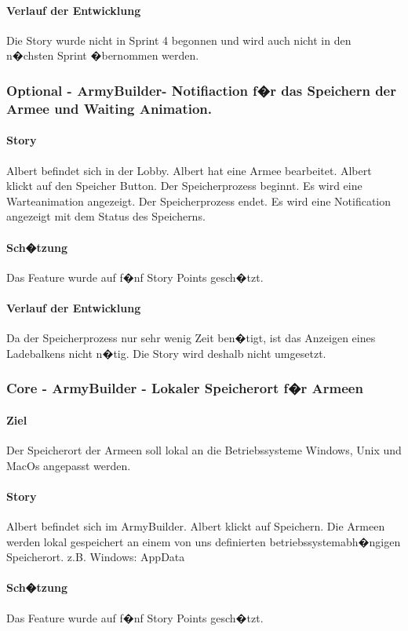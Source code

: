 \documentclass[12pt, titlepage]{scrartcl}
\begin{document}
			\paragraph{Verlauf der Entwicklung} 
			Die Story wurde nicht in Sprint 4 begonnen und wird auch nicht in den n�chsten Sprint �bernommen werden.
			\subsubsection{Optional - ArmyBuilder- Notifiaction f�r das Speichern der Armee und Waiting Animation.}
			\paragraph{Story} Albert befindet sich in der Lobby. Albert hat eine Armee bearbeitet. Albert klickt auf den Speicher Button. Der Speicherprozess beginnt. Es wird eine Warteanimation angezeigt. Der Speicherprozess endet. Es wird eine Notification angezeigt mit dem Status des Speicherns.
			\paragraph{Sch�tzung}
			Das Feature wurde auf f�nf Story Points gesch�tzt.
			\paragraph{Verlauf der Entwicklung} 
			Da der Speicherprozess nur sehr wenig Zeit ben�tigt, ist das Anzeigen eines Ladebalkens nicht n�tig. Die Story wird deshalb nicht umgesetzt.
			\subsubsection{Core - ArmyBuilder - Lokaler Speicherort f�r Armeen}
			\paragraph{Ziel} Der Speicherort der Armeen soll lokal an die Betriebssysteme Windows, Unix und MacOs angepasst werden. 
			\paragraph{Story} Albert befindet sich im ArmyBuilder. Albert klickt auf Speichern. Die Armeen werden lokal gespeichert an einem von uns definierten betriebssystemabh�ngigen Speicherort.
			z.B. Windows: AppData 
			\paragraph{Sch�tzung}
			Das Feature wurde auf f�nf Story Points gesch�tzt.
\end{document}
